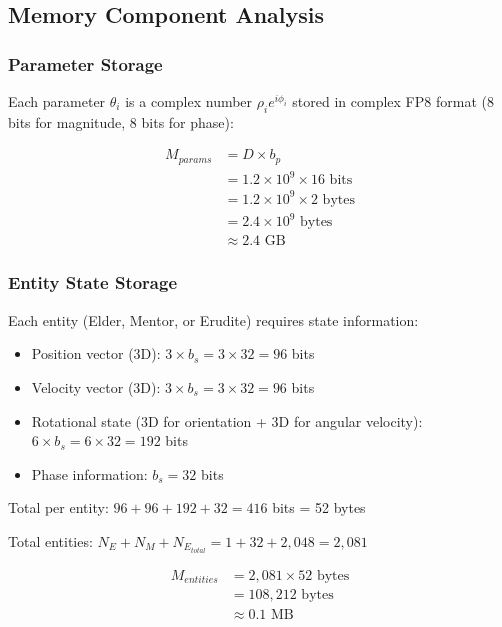 \subsection{Memory Component Analysis}

\subsubsection{Parameter Storage}

Each parameter $\theta_i$ is a complex number $\rho_i e^{i\phi_i}$ stored in complex FP8 format (8 bits for magnitude, 8 bits for phase):

\begin{align}
M_{params} &= D \times b_p \\
&= 1.2 \times 10^9 \times 16 \text{ bits} \\
&= 1.2 \times 10^9 \times 2 \text{ bytes} \\
&= 2.4 \times 10^9 \text{ bytes} \\
&\approx 2.4 \text{ GB}
\end{align}

\subsubsection{Entity State Storage}

Each entity (Elder, Mentor, or Erudite) requires state information:
\begin{itemize}
    \item Position vector (3D): $3 \times b_s = 3 \times 32 = 96$ bits
    \item Velocity vector (3D): $3 \times b_s = 3 \times 32 = 96$ bits
    \item Rotational state (3D for orientation + 3D for angular velocity): $6 \times b_s = 6 \times 32 = 192$ bits
    \item Phase information: $b_s = 32$ bits
\end{itemize}

Total per entity: $96 + 96 + 192 + 32 = 416$ bits = 52 bytes

Total entities: $N_E + N_M + N_{E_{total}} = 1 + 32 + 2,048 = 2,081$

\begin{align}
M_{entities} &= 2,081 \times 52 \text{ bytes} \\
&= 108,212 \text{ bytes} \\
&\approx 0.1 \text{ MB}
\end{align}

